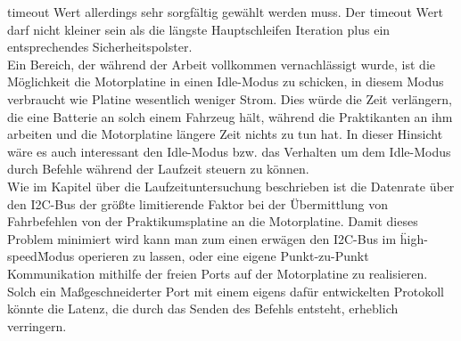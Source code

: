 timeout Wert allerdings sehr sorgfältig gewählt werden muss. Der timeout Wert darf nicht kleiner sein
als die längste Hauptschleifen Iteration plus ein entsprechendes Sicherheitspolster.\\
Ein Bereich, der während der Arbeit vollkommen vernachlässigt wurde, ist die Möglichkeit die
Motorplatine in einen Idle-Modus zu schicken, in diesem Modus verbraucht wie Platine wesentlich weniger
Strom. Dies würde die Zeit verlängern, die eine Batterie an solch einem Fahrzeug hält, während die
Praktikanten an ihm arbeiten und die Motorplatine längere Zeit nichts zu tun hat. In dieser Hinsicht
wäre es auch interessant den Idle-Modus bzw. das Verhalten um dem Idle-Modus durch Befehle während der
Laufzeit steuern zu können.\\
Wie im Kapitel über die Laufzeituntersuchung beschrieben ist die Datenrate über den I2C-Bus der größte
limitierende Faktor bei der Übermittlung von Fahrbefehlen von der Praktikumsplatine an die
Motorplatine. Damit dieses Problem minimiert wird kann man zum einen erwägen den I2C-Bus im \"high-speed\"
Modus operieren zu lassen, oder eine eigene Punkt-zu-Punkt Kommunikation mithilfe der freien Ports auf der
Motorplatine zu realisieren. Solch ein Maßgeschneiderter Port mit einem eigens dafür entwickelten Protokoll
könnte die Latenz, die durch das Senden des Befehls entsteht, erheblich verringern.
